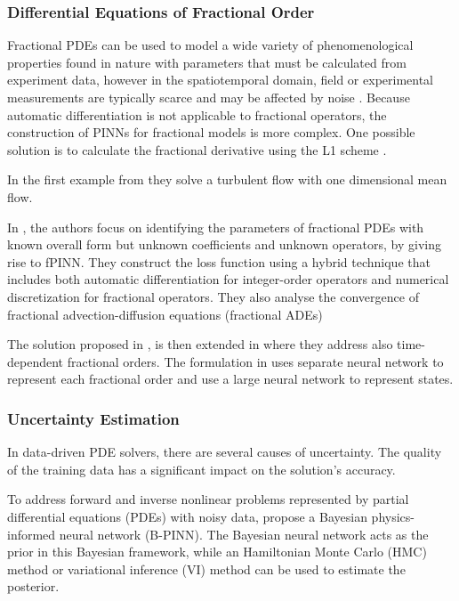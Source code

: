 \documentclass[pdflatex,sn-basic]{sn-jnl}%
\theoremstyle{thmstyleone}%
\theoremstyle{thmstyletwo}%
\theoremstyle{thmstylethree}%
\begin{document}
\subsubsection{Differential Equations of Fractional Order}
Fractional PDEs can be used to model a wide variety of phenomenological properties found in nature with parameters that must be calculated from experiment data, however in the spatiotemporal domain, field or experimental measurements are typically scarce and may be affected by noise \citep{Pan2019_FpinnsFractionalPhysics_LuPLK}. 
Because automatic differentiation is not applicable to fractional operators, the construction of PINNs for fractional models is more complex. One possible solution is to calculate the fractional derivative using the L1 scheme \citep{Meh2019_DiscoveringUniversalVariable_PanMPSK}.

In the first example from \cite{Meh2019_DiscoveringUniversalVariable_PanMPSK} they solve a turbulent flow with one dimensional mean flow.

In \cite{Pan2019_FpinnsFractionalPhysics_LuPLK}, the authors focus on identifying the parameters of fractional PDEs with known overall form but unknown coefficients and unknown operators, by giving rise to fPINN.
They construct the loss function using a hybrid technique that includes both automatic differentiation for integer-order operators and numerical discretization for fractional operators. 
They also analyse the convergence of fractional advection-diffusion equations (fractional ADEs)

The solution proposed in \cite{Pan2019_FpinnsFractionalPhysics_LuPLK}, is then extended in \cite{Kha2021_IdentifiabilityPredictabilityInteger_CaiKCZ}
where they address also time-dependent fractional orders.
The formulation in \cite{Kha2021_IdentifiabilityPredictabilityInteger_CaiKCZ} uses separate neural network to represent each fractional order and use a large neural network to represent states. 

\subsubsection{Uncertainty Estimation}
In data-driven PDE solvers, there are several causes of uncertainty.
The quality of the training data has a significant impact on the solution's accuracy. 

To address forward and inverse nonlinear problems represented by partial differential equations (PDEs) with noisy data, \cite{Yan2021_BPinnsBayesian_MenYMK}  propose a Bayesian physics-informed neural network (B-PINN).
The Bayesian neural network acts as the prior in this Bayesian framework, while an Hamiltonian Monte Carlo (HMC) method or variational inference (VI) method can be used to estimate the posterior.
\end{document}
